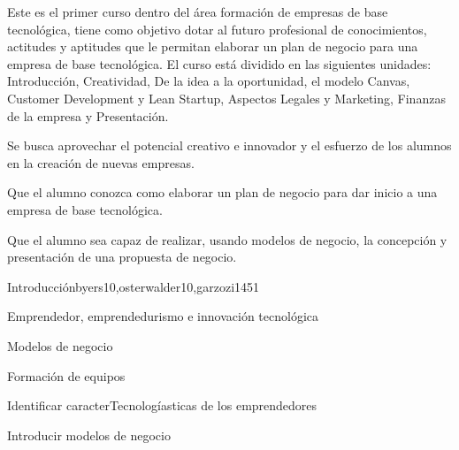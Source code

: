 \begin{syllabus}


\begin{justification}
Este es el primer curso dentro del área formación de empresas de
base tecnológica, tiene como objetivo dotar al futuro profesional 
de conocimientos, actitudes y aptitudes que le
permitan elaborar un plan de negocio para una empresa de base tecnológica.
El curso está dividido en las siguientes unidades:
Introducción, Creatividad, De la idea a la oportunidad, el modelo Canvas, Customer Development y Lean Startup, Aspectos Legales y Marketing, Finanzas de la empresa y Presentación.

Se busca aprovechar el potencial creativo e innovador y el esfuerzo de los alumnos en la creación de nuevas empresas.
\end{justification}

\begin{goals}
\item Que el alumno conozca como elaborar un plan de negocio para dar inicio a una empresa de base tecnológica.
\item Que el alumno sea capaz de realizar, usando modelos de negocio, la concepción y presentación de una propuesta de negocio.
\end{goals}

\begin{outcomes}
\end{outcomes}

\begin{unit}{Introducción}{byers10,osterwalder10,garzozi14}{5}{1}
\begin{topics}
      \item Emprendedor, emprendedurismo e innovación tecnológica
      \item Modelos de negocio
      \item Formación de equipos
   \end{topics}

   \begin{unitgoals}
      \item Identificar caracterTecnologíasticas de los emprendedores
      \item Introducir modelos de negocio 
   \end{unitgoals}
\end{unit}


\end{syllabus}
